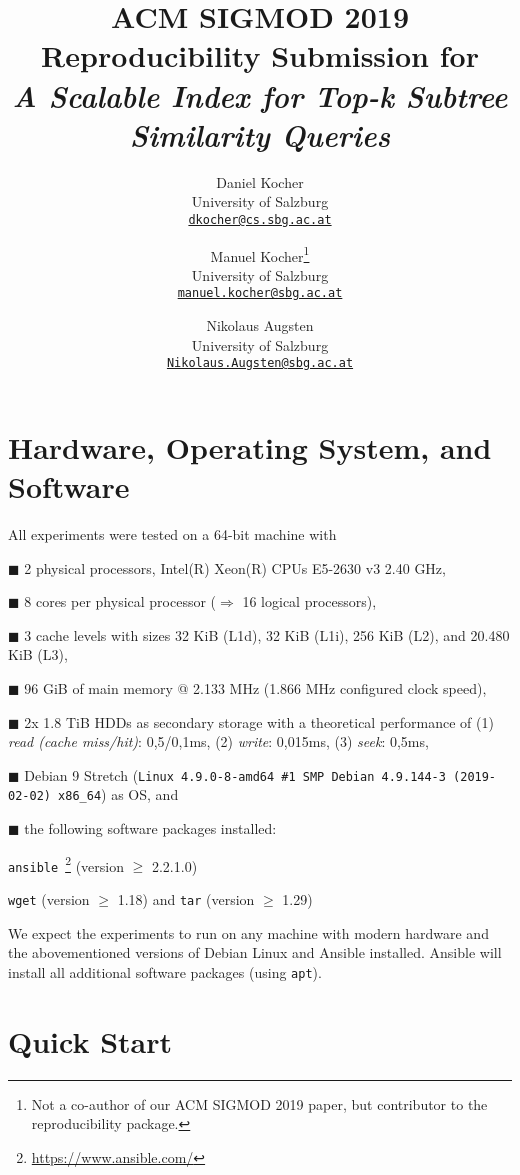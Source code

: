\documentclass[a4, 10pt]{article}
\author{
  Daniel Kocher \\
  University of Salzburg \\
  \href{mailto:dkocher@cs.sbg.ac.at}{\small\texttt{dkocher@cs.sbg.ac.at}}
  \and
  Manuel Kocher\footnote{Not a co-author of our ACM SIGMOD 2019 paper, but contributor to the reproducibility package.} \\
  University of Salzburg \\
  \href{mailto:manuel.kocher@sbg.ac.at}{\small\texttt{manuel.kocher@sbg.ac.at}}
  \and
  Nikolaus Augsten \\
  University of Salzburg \\
  \href{mailto:Nikolaus.Augsten@sbg.ac.at}{\small\texttt{Nikolaus.Augsten@sbg.ac.at}}
}
\title{ACM SIGMOD 2019 Reproducibility Submission for \\ \emph{A Scalable Index for Top-k Subtree Similarity Queries}}
\newenvironment{packed_item}{
\begin{itemize}
  \setlength{\itemsep}{1pt}
  \setlength{\parskip}{0pt}
  \setlength{\parsep}{0pt}
}{\end{itemize}}
\begin{document}
\maketitle

\section{Hardware, Operating System, and Software}
\label{sec:hardware-operating-system-and-software}

All experiments were tested on a 64-bit machine with

\begin{packed_item}
  \item[$\blacksquare$] 2 physical processors, Intel(R) Xeon(R) CPUs E5-2630 v3 2.40 GHz,
  \item[$\blacksquare$] 8 cores per physical processor ($\Rightarrow$ 16 logical processors),
  \item[$\blacksquare$] 3 cache levels with sizes 32 KiB (L1d), 32 KiB (L1i), 256 KiB (L2), and 20.480 KiB (L3),
  \item[$\blacksquare$] 96 GiB of main memory @ 2.133 MHz (1.866 MHz configured clock speed),
  \item[$\blacksquare$] 2x 1.8 TiB HDDs as secondary storage with a theoretical performance of \newline (1) \emph{read (cache miss/hit)}: 0,5/0,1ms, (2) \emph{write}: 0,015ms, (3) \emph{seek}: 0,5ms,
  \item[$\blacksquare$] Debian 9 Stretch (\texttt{Linux 4.9.0-8-amd64 \#1 SMP Debian 4.9.144-3 (2019-02-02) x86\_64}) as OS, and
  \item[$\blacksquare$] the following software packages installed:
    \begin{packed_item}
      \item \texttt{ansible}~\footnote{\url{https://www.ansible.com/}} (version $\geq$ 2.2.1.0)
      \item \texttt{wget} (version $\geq$ 1.18) and \texttt{tar} (version $\geq$ 1.29)
    \end{packed_item}
\end{packed_item}

We expect the experiments to run on any machine with modern hardware and the abovementioned versions of Debian Linux and Ansible installed. Ansible will install all additional software packages (using \texttt{apt}).

\section{Quick Start}
\end{document}
